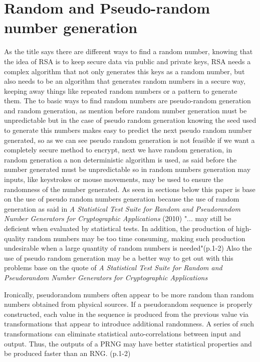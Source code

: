 \documentclass[conference,compsoc, 10pt]{IEEEtran}
\begin{document}
\section{Random and Pseudo-random number generation}
As the title says there are different ways to find a random number, knowing that the idea of RSA is to keep secure data via public and private keys, RSA needs a complex algorithm that not only generates this keys as a random number, but also needs to be an algorithm that generates random numbers in a secure way, keeping away  things like repeated random numbers or a pattern to generate them. The to basic ways to find random numbers are pseudo-random generation and random generation, as mention before random number generation must be unpredictable but in the case of pseudo random generation knowing the seed used to generate this numbers makes easy to predict the next pseudo random number generated, so as we can see  pseudo random generation is not feasible if we want a completely secure method to encrypt, next we have random generation, in random generation a non deterministic algorithm is used, as said before the number generated must be unpredictable so in random numbers generation may inputs, like keystrokes or mouse movements, may be used to ensure the randomness of the number generated. As seen in sections below this paper is base on the use of pseudo random numbers generation because the use of random generation as said in \textit{A Statistical Test Suite for Random and Pseudorandom Number Generators for Cryptographic Applications} (2010) "... may still be deficient when evaluated by statistical tests. In addition, the production of high-quality random numbers may be too time consuming, making such production undesirable when a
large quantity of random numbers is needed"(p.1-2)\newline
Also the use of pseudo random generation may be a better way to get out with this problems base on the quote of \textit{A Statistical Test Suite for Random and Pseudorandom Number Generators for Cryptographic Applications}
\begin{center}
	Ironically, pseudorandom numbers often appear to be more random than random numbers obtained from
	physical sources. If a pseudorandom sequence is properly constructed, each value in the sequence is
	produced from the previous value via transformations that appear to introduce additional randomness. A
	series of such transformations can eliminate statistical auto-correlations between input and output. Thus,
	the outputs of a PRNG may have better statistical properties and be produced faster than an RNG. (p.1-2)
\end{center}
\end{document}

